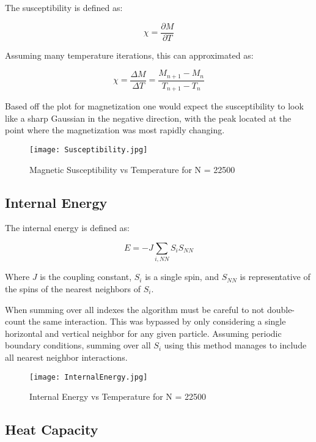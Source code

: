 \documentclass[10pt,letterpaper]{article}
\begin{document}
The susceptibility is defined as: 

\begin{equation}
\chi = \frac{\partial{M}}{\partial{T}}
\end{equation}

Assuming many temperature iterations, this can approximated as:

\begin{equation}
\chi = \frac{\Delta{M}}{\Delta{T}} = \frac{M_{n+1} - M_{n}}{T_{n+1} - T_{n}}
\end{equation}

Based off the plot for magnetization one would expect the susceptibility to look like a sharp Gaussian in the negative direction, with the peak located at the point where the magnetization was most rapidly changing. 

\begin{figure}[H]
\centering
\texttt{[image: Susceptibility.jpg]}
\caption{Magnetic Susceptibility vs Temperature for N = 22500}
\end{figure}

\subsection{Internal Energy}

The internal energy is defined as:

\begin{equation}
E = - J \sum_{i,NN}S_{i}S_{NN}
\end{equation}

Where $J$ is the coupling constant, $S_{i}$ is a single spin, and $S_{NN}$ is representative of the spins of the nearest neighbors of $S_{i}$. 

When summing over all indexes the algorithm must be careful to not double-count the same interaction. This was bypassed by only considering a single horizontal and vertical neighbor for any given particle. Assuming periodic boundary conditions, summing over all $S_{i}$ using this method manages to include all nearest neighbor interactions. 

\begin{figure}[H]
\centering
\texttt{[image: InternalEnergy.jpg]}
\caption{Internal Energy vs Temperature for N = 22500}
\end{figure}

\subsection{Heat Capacity}
\end{document}
